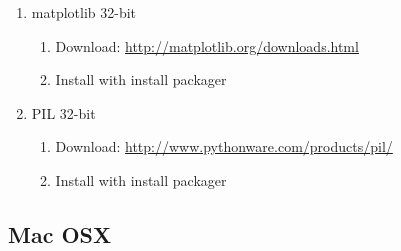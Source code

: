 \documentclass[a4paper,10pt]{article}
\begin{document}
\begin{enumerate}
            \item matplotlib 32-bit 
                \begin{enumerate}
                    \item Download: \url{http://matplotlib.org/downloads.html}
                    \item Install with install packager
                \end{enumerate}

            \item PIL 32-bit 
                \begin{enumerate}
                    \item Download:
                        \url{http://www.pythonware.com/products/pil/}
                    \item Install with install packager
                \end{enumerate}
        \end{enumerate}
        \;

    \subsection{Mac OSX}
\end{document}
